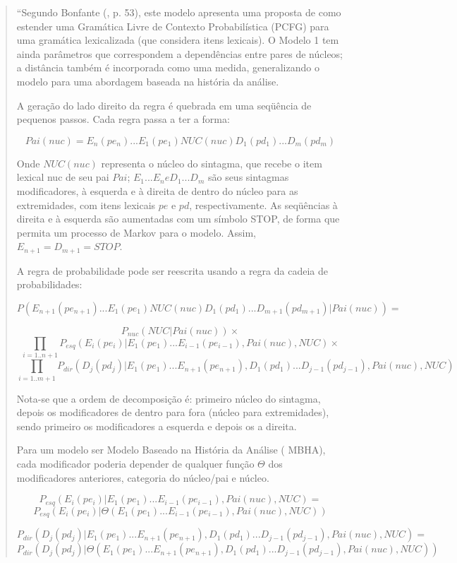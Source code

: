 \begin{quotation}
\footnotesize
``Segundo Bonfante (\cite{bonfante03}, p. 53), este modelo apresenta uma proposta de como estender uma Gramática Livre de Contexto Probabilística (PCFG) para uma gramática lexicalizada (que considera itens lexicais). O Modelo 1 tem ainda parâmetros que correspondem a dependências entre pares de núcleos; a distância também é incorporada como uma medida, generalizando o modelo para uma abordagem baseada na história da análise.

A geração do lado direito da regra é quebrada em uma seqüência de pequenos passos. Cada regra passa a ter a forma:

$$Pai(nuc) = E_n(pe_n)...E_1(pe_1)NUC(nuc)D_1(pd_1)...D_m(pd_m)$$

Onde $NUC(nuc)$ representa o núcleo do sintagma, que recebe o item lexical nuc de seu pai $Pai$; $E_1...E_n e D_1...D_m$ são seus sintagmas modificadores, à esquerda e à direita de dentro do núcleo para as extremidades, com itens lexicais $pe$ e $pd$, respectivamente. As seqüências à direita e à esquerda são aumentadas com um símbolo STOP, de forma que permita um processo de Markov para o modelo. Assim, $ E_{n+1} = D_{m+1} = STOP $.

A regra de probabilidade pode ser reescrita usando a regra da cadeia de probabilidades:

$$P(E_{n+1}(pe_{n+1})...E_1(pe_1)NUC(nuc)D_1(pd_1)...D_{m+1}(pd_{m+1})|Pai(nuc)) = $$

$$P_{nuc}(NUC|Pai(nuc)) \times $$
$$\prod_{i=1..n+1} P_{esq}(E_i(pe_i)|E_1(pe_1)...E_{i-1}(pe_{i-1}), Pai(nuc),NUC) \times $$
$$\prod_{i=1..m+1} P_{dir}(D_j(pd_j)|E_1(pe_1)...E_{n+1}(pe_{n+1}),D_1(pd_1)...D_{j-1}(pd_{j-1}), Pai(nuc),NUC)  $$

Nota-se que a ordem de decomposição é: primeiro núcleo do sintagma, depois os modificadores de dentro para fora (núcleo para extremidades), sendo primeiro os modificadores a esquerda e depois os a direita.

Para um modelo ser Modelo Baseado na História da Análise ( MBHA), cada modificador poderia depender de qualquer função $\Theta$ dos modificadores anteriores, categoria do núcleo/pai e núcleo.

$$P_{esq}(E_i(pe_i)|E_1(pe_1)...E_{i-1}(pe_{i-1}), Pai(nuc),NUC) = $$
$$P_{esq}(E_i(pe_i)|\Theta(E_1(pe_1)...E_{i-1}(pe_{i-1}), Pai(nuc),NUC))$$

$$P_{dir}(D_j(pd_j)|E_1(pe_1)...E_{n+1}(pe_{n+1}),D_1(pd_1)...D_{j-1}(pd_{j-1}), Pai(nuc),NUC) = $$
$$P_{dir}(D_j(pd_j)|\Theta(E_1(pe_1)...E_{n+1}(pe_{n+1}),D_1(pd_1)...D_{j-1}(pd_{j-1}), Pai(nuc),NUC))$$


\end{quotation}
